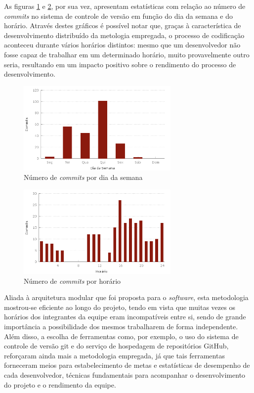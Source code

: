 As figuras \ref{fig:dayofweek} e \ref{fig:hourofday}, por sua vez, apresentam estatísticas com relação ao número de \emph{commits} no sistema de controle de versão em função do dia da semana e do horário.
Através destes gráficos é possível notar que, graças à característica de desenvolvimento distribuído da metologia empregada, o processo de codificação aconteceu durante vários horários distintos: mesmo que um desenvolvedor não fosse capaz de trabalhar em um determinado horário, muito provavelmente outro seria, resultando em um impacto positivo sobre o rendimento do processo de desenvolvimento.

\begin{figure}[!htb]
	\centering
	\includegraphics[width=0.7\textwidth]{./plots/day_of_week.png}
	\caption[Número de \emph{commits} por dia da semana]{Número de \emph{commits} por dia da semana}
	\label{fig:dayofweek}
\end{figure}

\begin{figure}[!htb]
	\centering
	\includegraphics[width=0.7\textwidth]{./plots/hour_of_day.png}
	\caption[Número de \emph{commits} por horário]{Número de \emph{commits} por horário}
	\label{fig:hourofday}
\end{figure}

Aliada à arquitetura modular que foi proposta para o \emph{software}, esta metodologia mostrou-se eficiente ao longo do projeto, tendo em vista que muitas vezes os horários dos integrantes da equipe eram incompatíveis entre si, sendo de grande importância a possibilidade dos mesmos trabalharem de forma independente.
Além disso, a escolha de ferramentas como, por exemplo, o uso do sistema de controle de versão git e do serviço de hospedagem de repositórios GitHub, reforçaram ainda mais a metodologia empregada, já que tais ferramentas forneceram meios para estabelecimento de metas e estatísticas de desempenho de cada desenvolvedor, técnicas fundamentais para acompanhar o desenvolvimento do projeto e o rendimento da equipe.

